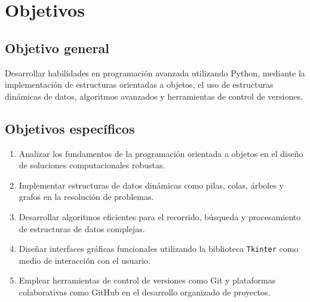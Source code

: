 \section{Objetivos}

\subsection*{Objetivo general}

Desarrollar habilidades en programación avanzada utilizando Python, mediante la implementación de estructuras orientadas a objetos, el uso de estructuras dinámicas de datos, algoritmos avanzados y herramientas de control de versiones.

\subsection*{Objetivos específicos}

\begin{enumerate}
  \item Analizar los fundamentos de la programación orientada a objetos en el diseño de soluciones computacionales robustas.
  \item Implementar estructuras de datos dinámicas como pilas, colas, árboles y grafos en la resolución de problemas.
  \item Desarrollar algoritmos eficientes para el recorrido, búsqueda y procesamiento de estructuras de datos complejas.
  \item Diseñar interfaces gráficas funcionales utilizando la biblioteca \texttt{Tkinter} como medio de interacción con el usuario.
  \item Emplear herramientas de control de versiones como Git y plataformas colaborativas como GitHub en el desarrollo organizado de proyectos.
\end{enumerate}
